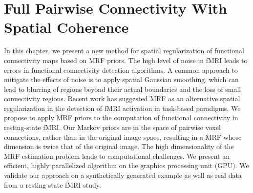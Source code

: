 \chapter{Full Pairwise Connectivity With Spatial Coherence}
\label{chap:method1}

In this chapter, we present a new method for spatial regularization of
functional connectivity maps based on MRF priors. The high level of noise in
fMRI leads to errors in functional connectivity detection algorithms. A common
approach to mitigate the effects of noise is to apply spatial Gaussian
smoothing, which can lead to blurring of regions beyond their actual boundaries
and the loss of small connectivity regions. Recent work has suggested MRF as an
alternative spatial regularization in the detection of fMRI activation in
task-based paradigms. We propose to apply MRF priors to the computation of
functional connectivity in resting-state fMRI. Our Markov priors are in the
space of pairwise voxel connections, rather than in the original image space,
resulting in a MRF whose dimension is twice that of the original image. The high
dimensionality of the MRF estimation problem leads to computational
challenges. We present an efficient, highly parallelized algorithm on the
graphics processing unit (GPU). We validate our approach on a synthetically
generated example as well as real data from a resting state fMRI study.

